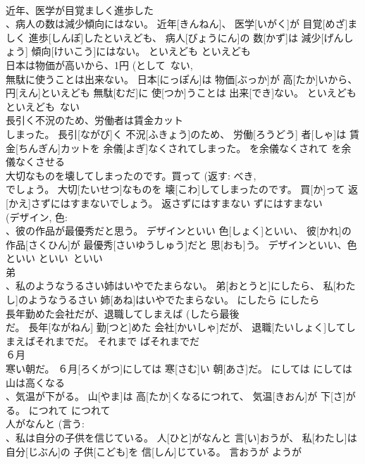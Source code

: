 \documentclass[8pt]{extreport}
\begin{document}
\begin{CJK}{UTF8}{min}
\\	近年、医学が目覚ましく進歩した 
\\	、病人の数は減少傾向にはない。	近年[きんねん]、 医学[いがく]が 目覚[めざ]ましく 進歩[しんぽ]したといえども、 病人[びょうにん]の 数[かず]は 減少[げんしょう] 傾向[けいこう]にはない。	といえども	といえども	
\\	日本は物価が高いから、1円 (として~ない, 
\\	無駄に使うことは出来ない。	日本[にっぽん]は 物価[ぶっか]が 高[たか]いから、 
\\	円[えん]といえども 無駄[むだ]に 使[つか]うことは 出来[でき]ない。	といえども	といえども~ない	
\\	長引く不況のため、労働者は賃金カット 
\\	しまった。	長引[ながび]く 不況[ふきょう]のため、 労働[ろうどう] 者[しゃ]は 賃金[ちんぎん]カットを 余儀[よぎ]なくされてしまった。	を余儀なくされて	を余儀なくさせる	
\\	大切なものを壊してしまったのです。買って (返す: べき, 
\\	でしょう。	大切[たいせつ]なものを 壊[こわ]してしまったのです。 買[か]って 返[かえ]さずにはすまないでしょう。	返さずにはすまない	ずにはすまない	
\\	(デザイン, 色: 
\\	、彼の作品が最優秀だと思う。	デザインといい 色[しょく]といい、 彼[かれ]の 作品[さくひん]が 最優秀[さいゆうしゅう]だと 思[おも]う。	デザインといい、色といい	といい~といい	
\\	弟 
\\	、私のようなうるさい姉はいやでたまらない。	弟[おとうと]にしたら、 私[わたし]のようなうるさい 姉[あね]はいやでたまらない。	にしたら	にしたら	
\\	長年勤めた会社だが、退職してしまえば (したら最後~ 
\\	だ。	長年[ながねん] 勤[つと]めた 会社[かいしゃ]だが、 退職[たいしょく]してしまえばそれまでだ。	それまで	ばそれまでだ	
\\	６月 
\\	寒い朝だ。	６月[ろくがつ]にしては 寒[さむ]い 朝[あさ]だ。	にしては	にしては	
\\	山は高くなる 
\\	、気温が下がる。	山[やま]は 高[たか]くなるにつれて、 気温[きおん]が 下[さ]がる。	につれて	につれて	
\\	人がなんと (言う: 
\\	、私は自分の子供を信じている。	人[ひと]がなんと 言[い]おうが、 私[わたし]は 自分[じぶん]の 子供[こども]を 信[しん]じている。	言おうが	ようが	

\end{CJK}
\end{document}
